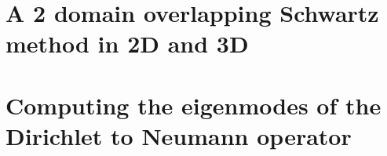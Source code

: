 \section{A 2 domain overlapping Schwartz method in 2D and 3D}
\label{sec:2-doma-overl}

\section{Computing the eigenmodes of the Dirichlet to Neumann operator}
\label{sec:comp-eigenm-dirichl}





